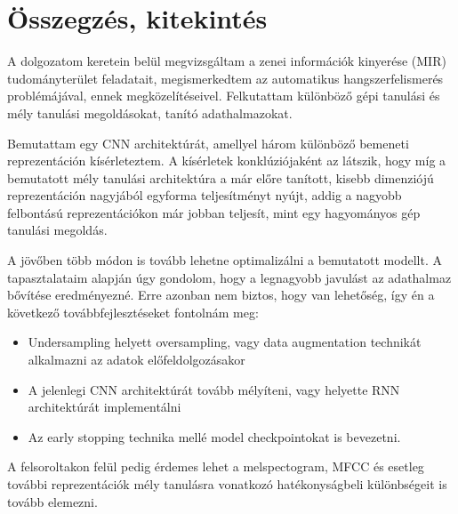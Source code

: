 \chapter{Összegzés, kitekintés}
\label{ch:sum}

A dolgozatom keretein belül megvizsgáltam a zenei információk kinyerése (MIR) tudományterület feladatait, megismerkedtem az automatikus hangszerfelismerés problémájával, ennek megközelítéseivel. Felkutattam különböző gépi tanulási és mély tanulási megoldásokat, tanító adathalmazokat.

Bemutattam egy CNN architektúrát, amellyel három különböző bemeneti reprezentáción kísérleteztem. A kísérletek konklúziójaként az látszik, hogy míg a bemutatott mély tanulási architektúra a már előre tanított, kisebb dimenziójú reprezentáción nagyjából egyforma teljesítményt nyújt, addig a nagyobb felbontású reprezentációkon már jobban teljesít, mint egy hagyományos gép tanulási megoldás.

A jövőben több módon is tovább lehetne optimalizálni a bemutatott modellt. A tapasztalataim alapján úgy gondolom, hogy a legnagyobb javulást az adathalmaz bővítése eredményezné. Erre azonban nem biztos, hogy van lehetőség, így én a következő továbbfejlesztéseket fontolnám meg:
\begin{itemize}
 \item Undersampling helyett oversampling, vagy data augmentation technikát alkalmazni az adatok előfeldolgozásakor
 \item A jelenlegi CNN architektúrát tovább mélyíteni, vagy helyette RNN architektúrát implementálni
 \item Az early stopping technika mellé model checkpointokat is bevezetni.
\end{itemize}

A felsoroltakon felül pedig érdemes lehet a melspectogram, MFCC és esetleg további reprezentációk mély tanulásra vonatkozó hatékonyságbeli különbségeit is tovább elemezni.